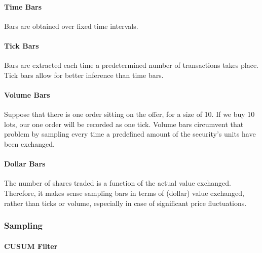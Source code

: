 \documentclass{article}
\begin{document}
\paragraph{Time Bars}
Bars are obtained over fixed time intervals.

\paragraph{Tick Bars}
Bars are extracted each time a predetermined number of transactions takes place. Tick bars allow for better inference than time bars.

\paragraph{Volume Bars}
Suppose that there is one order sitting on the offer, for a size of 10. If we buy 10 lots, our one order will be recorded as one tick. Volume bars circumvent that problem by sampling every time a predefined amount of the security’s units have been exchanged.

\paragraph{Dollar Bars}
The number of shares traded is a function of the actual value exchanged. Therefore, it makes sense sampling bars in terms of (dollar) value exchanged, rather than ticks or volume, especially in case of significant price fluctuations.

\subsubsection{Sampling}
\paragraph{CUSUM Filter}
\end{document}
